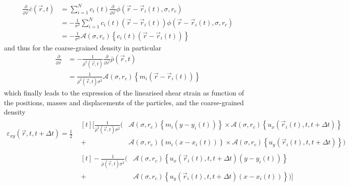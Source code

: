 \documentclass[class=report, float=false, crop=false]{standalone}
\begin{document}
\begin{equation}
\begin{aligned}
\frac{\partial}{\partial \vec{r}} \bar{c}(\vec{r}, t) &= \sum_{i=1}^N c_i(t) \frac{\partial}{\partial \vec{r}} \phi(\vec{r} - \vec{r}_i(t), \sigma, r_c)\\
&= -\frac{1}{\sigma^2} \sum_{i=1}^N c_i(t) (\vec{r} - \vec{r}_i(t)) \phi(\vec{r} - \vec{r}_i(t), \sigma, r_c)\\
&= -\frac{1}{\sigma^2} \mathcal{A}(\sigma, r_c)\left\{c_i(t)(\vec{r} - \vec{r}_i(t))\right\}
\end{aligned}
\end{equation}
and thus for the coarse-grained density in particular
\begin{equation}
\begin{aligned}
\frac{\partial}{\partial\vec{r}} &= -\frac{1}{\bar{\rho}^2(\vec{r}, t)} \frac{\partial}{\partial\vec{r}} \bar{\rho}(\vec{r}, t)\\
&= \frac{1}{\bar{\rho}^2(\vec{r}, t)\sigma^2} \mathcal{A}(\sigma, r_c)\left\{m_i(\vec{r} - \vec{r}_i(t))\right\}
\end{aligned}
\end{equation}
which finally leads to the expression of the linearised shear strain as function of the positions, masses and displacements of the particles, and the coarse-grained density
\begin{equation}
\begin{aligned}
\varepsilon_{xy}(\vec{r}, t, t + \Delta t) = \frac{1}{2}
&\begin{aligned}[t]\Bigg[\frac{1}{\bar{\rho}^2(\vec{r}, t)\sigma^2} \Big(&\mathcal{A}(\sigma, r_c)\left\{m_i(y - y_i(t))\right\} \times \mathcal{A}(\sigma, r_c)\left\{u_x(\vec{r}_i(t), t, t + \Delta t)\right\} \\ + &\mathcal{A}(\sigma, r_c)\left\{m_i(x - x_i(t))\right\} \times \mathcal{A}(\sigma, r_c)\left\{u_y(\vec{r}_i(t), t, t + \Delta t)\right\}\Big)\end{aligned}\\
& \begin{aligned}[t]-\frac{1}{\bar{\rho}(\vec{r}, t)\sigma^2} \Big(&\mathcal{A}(\sigma, r_c)\left\{u_x(\vec{r}_i(t), t, t + \Delta t)(y - y_i(t))\right\} \\ + &\mathcal{A}(\sigma, r_c)\left\{u_y(\vec{r}_i(t), t, t + \Delta t)(x - x_i(t))\right\}\Big)\Bigg]\end{aligned}
\end{aligned}
\label{linearised_cg_shear_strain}
\end{equation}
\end{document}
